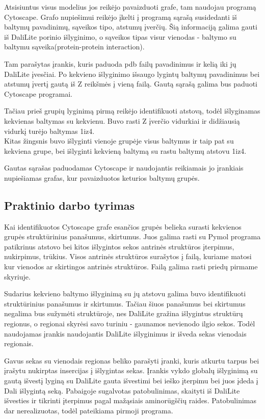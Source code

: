 \documentclass[a4paper,12pt]{article}
\begin{document}
Atsisiuntus visus modelius jos reikėjo pavaizduoti grafe, tam naudojau programą Cytoscape. Grafo nupiešimui reikėjo įkelti į programą sąrašą susidedanti iš baltymų pavadinimų, sąveikos tipo, atstumų įverčių. Šią informaciją galima gauti iš DaliLite porinio išlyginimo, o sąveikos tipas visur vienodas - baltymo su baltymu sąveika(protein-protein interaction).

Tam parašytas įrankis, kuris paduoda pdb failų pavadinimus ir kelią iki jų DaliLite įvesčiai. Po kekvieno išlyginimo išsaugo lygintų baltymų pavadinimus bei atstumų įvertį gautą iš Z reikšmės į vieną failą. Gautą sąrašą galima bus paduoti Cytoscape programai.

Tačiau prieš grupių lyginimą pirmą reikėjo identifikuoti atstovą, todėl išlyginamas kekvienas baltymas su kekvienu. Buvo rasti Z įverčio vidurkiai ir didžiausią vidurkį turėjo baltymas 1iz4.\\
Kitas žingsnis buvo išlyginti vienoje grupėje visus baltymus ir taip pat su kekviena grupe, bei išlyginti kekvieną baltymą su rastu baltymų atstovu 1iz4.

Gautas sąrašas paduodamas Cytoscape ir naudojantis reikiamais jo įrankiais nupiešiamas grafas, kur pavaizduotos keturios baltymų grupės.


\subsection{Praktinio darbo tyrimas}

Kai identifikuotos Cytoscape grafe esančios grupės belieka surasti kekvienos grupės struktūrinius panašumus, skirtumus. Juos galima rasti su Pymol programa patikrinus atstovo bei kitos išlygintos sekos antrinės struktūros įterpimus, nukirpimus, trūkius. Visos antrinės struktūros surašytos į failą, kuriame matosi kur vienodos ar skirtingos antrinės struktūros. Failą galima rasti priedų pirmame skyriuje.

Sudarius kekvieno baltymo išlyginimą su jų atstovu galima buvo identifikuoti struktūrinius panašumus ir skirtumus. Tačiau šiuos panašumus bei skirtumus negalima bus sužymėti struktūroje, nes DaliLite gražina išlygintus struktūrų regionus, o regionai skyrėsi savo turiniu - gaunamos nevienodo ilgio sekos. Todėl naudojamas įrankis naudojantis DaliLite išlyginimus ir išveda sekas vienodais regionais.

Gavus sekas su vienodais regionas beliko parašyti įranki, kuris atkurtu tarpus bei įrašytu nukirptas insercijas į išlygintas sekas. Įrankis vykdo globalų išlyginimą su gautą išvestį lyginą su DaliLite gauta išvestimi bei ieško įterpimu bei juos įdeda į Dali išlygintą seką. Pabaigoje sugalvotas patobulinimas, skaityti iš DaliLite išvesties ir tikrinti įterpimus  pagal mažąsiais aminorūgščių raides. Patobulinimas dar nerealizuotas, todėl pateikiama pirmoji programa.
\end{document}
